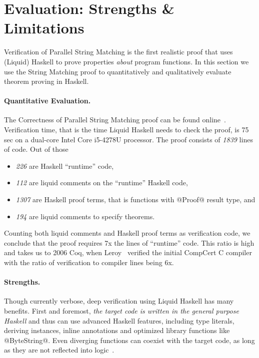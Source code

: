 \section{Evaluation: Strengths \& Limitations}\label{sec:evaluation}

Verification of Parallel String Matching is the first realistic
proof that uses (Liquid) Haskell
to prove properties \textit{about} program functions.
%
In this section we use the String Matching proof
to quantitatively and qualitatively evaluate theorem proving in Haskell.

\paragraph{Quantitative Evaluation.}
The Correctness of Parallel String Matching proof
can be found online~\cite{implementation}.
%
Verification time, that is the time Liquid Haskell needs to check the proof,
is 75 sec on a dual-core Intel Core i5-4278U processor.
%
The proof consists of \textit{1839} lines of code.
%
Out of those
\begin{itemize}
\item \textit{226} are Haskell ``runtime'' code,
\item \textit{112} are liquid comments on the ``runtime'' Haskell code,
\item \textit{1307} are Haskell proof terms, that is functions with @Proof@ result type, and
\item \textit{194}  are liquid comments to specify theorems.
\end{itemize}
Counting both liquid comments and Haskell proof terms as verification code,
we conclude that the proof requires 7x the lines of ``runtime'' code.
%
This ratio is high and takes us to 2006 Coq,
when Leroy~\cite{Leroy06formalcertification} verified
the initial CompCert C compiler with
the ratio of verification to compiler lines being 6x.

\paragraph{Strengths.}
Though currently verbose,
deep verification using Liquid Haskell has many benefits.
%
First and foremost,
\textit{the target code is written in the general purpose Haskell}
and thus can use advanced Haskell features, including
type literals, deriving instances, inline annotations
and optimized library functions like @ByteString@.
Even diverging functions can coexist with the target code, as long
as they are not reflected into logic~\cite{Vazou14}.

